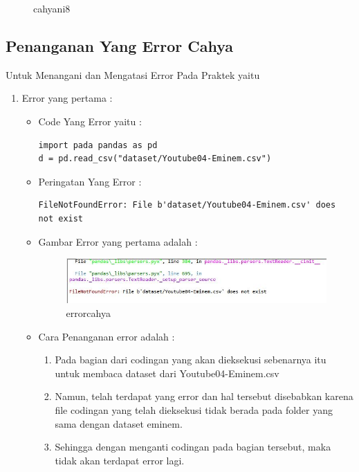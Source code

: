 \begin{enumerate}
\begin{itemize}
\begin{figure}[!hbtp]
\caption{cahyani8}
\label{cahyani8}
\end{figure}
\par
\par
\end{itemize}
\par
\par
\par
\end{enumerate}

\par
\par
\par
\subsection{Penanganan Yang Error Cahya}
Untuk Menangani dan Mengatasi Error Pada Praktek yaitu 
\begin{enumerate}
\item Error yang pertama :
\begin{itemize} 
\item Code Yang Error yaitu :
\begin{lstlisting}
import pada pandas as pd
d = pd.read_csv("dataset/Youtube04-Eminem.csv")
\end{lstlisting}
\item Peringatan Yang Error :
\begin{lstlisting}
FileNotFoundError: File b'dataset/Youtube04-Eminem.csv' does not exist
\end{lstlisting}
\item Gambar Error yang pertama adalah : 
\begin{figure}[!hbtp]
\centering
\includegraphics[scale=0.3]{figures/errorcahya.jpg}
\caption{errorcahya}
\label{errorcahya}
\end{figure}
\end{itemize}
\begin{itemize}
\item Cara Penanganan error adalah :
\begin{enumerate}
\item Pada bagian dari codingan yang akan dieksekusi sebenarnya itu untuk membaca dataset dari Youtube04-Eminem.csv
\item Namun, telah terdapat yang error dan hal tersebut disebabkan karena file codingan yang telah dieksekusi tidak berada pada folder yang sama dengan dataset eminem.
\item Sehingga dengan menganti codingan pada bagian tersebut, maka tidak akan terdapat error lagi.
\par
\par
\end{enumerate}
\end{itemize}
\end{enumerate}
